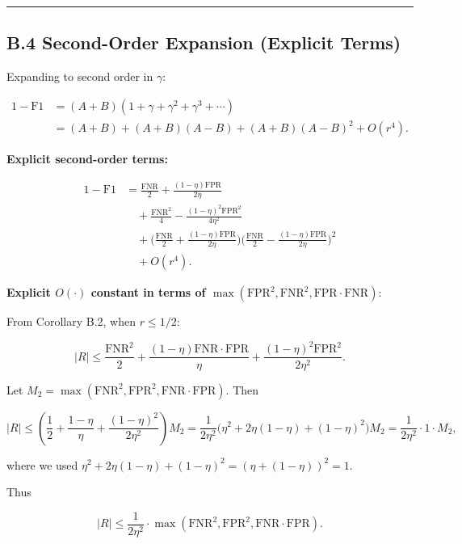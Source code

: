 \documentclass[
  12pt,
]{article}
\begin{document}
\begin{center}\rule{0.5\linewidth}{0.5pt}\end{center}

\subsection{B.4 Second-Order Expansion (Explicit
Terms)}\label{b.4-second-order-expansion-explicit-terms}

Expanding to second order in \(\gamma\):

\[
\begin{aligned}
1 - \text{F1} &= (A+B)(1 + \gamma + \gamma^2 + \gamma^3 + \cdots) \\
&= (A+B) + (A+B)(A-B) + (A+B)(A-B)^2 + O(r^4).
\end{aligned}\]

\textbf{Explicit second-order terms:}

\[
\begin{aligned}
1 - \text{F1} &= \frac{\text{FNR}}{2} + \frac{(1-\eta)\text{FPR}}{2\eta} \\
&\quad + \frac{\text{FNR}^2}{4} - \frac{(1-\eta)^2\text{FPR}^2}{4\eta^2} \\
&\quad + \big(\tfrac{\text{FNR}}{2} + \tfrac{(1-\eta)\text{FPR}}{2\eta}\big)
\big(\tfrac{\text{FNR}}{2} - \tfrac{(1-\eta)\text{FPR}}{2\eta}\big)^2 \\
&\quad + O(r^4).
\end{aligned}
\]

\textbf{Explicit \(O(\cdot)\) constant in terms of
\(\max(\text{FPR}^2, \text{FNR}^2, \text{FPR}\cdot\text{FNR})\)}:

From Corollary B.2, when \(r \leq 1/2\):

\[|R| \leq \frac{\text{FNR}^2}{2} + \frac{(1-\eta)\text{FNR}\cdot\text{FPR}}{\eta}
+ \frac{(1-\eta)^2\text{FPR}^2}{2\eta^2}.\]

Let
\(M_2 = \max(\text{FNR}^2, \text{FPR}^2, \text{FNR}\cdot\text{FPR})\).
Then

\[|R| \leq \left(\frac{1}{2} + \frac{1-\eta}{\eta} + \frac{(1-\eta)^2}{2\eta^2}\right) M_2
= \frac{1}{2\eta^2}\big(\eta^2 + 2\eta(1-\eta) + (1-\eta)^2\big) M_2
= \frac{1}{2\eta^2} \cdot 1 \cdot M_2,\]

where we used
\(\eta^2 + 2\eta(1-\eta) + (1-\eta)^2 = (\eta + (1-\eta))^2 = 1\).

Thus

\[|R| \leq \frac{1}{2\eta^2} \cdot \max(\text{FNR}^2, \text{FPR}^2, \text{FNR}\cdot\text{FPR}).\]
\end{document}
